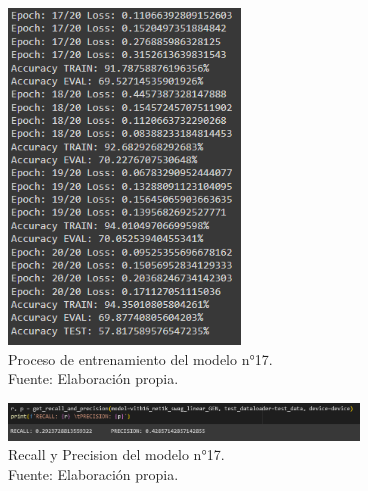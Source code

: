 \begin{figure}[H]
	\begin{center}
		\includegraphics[width=0.55\textwidth]{4/figures/model17_train.PNG}
		\caption[Proceso de entrenamiento del modelo n°17]{Proceso de entrenamiento del modelo n°17. \\
		Fuente: Elaboración propia.}
		\label{4:fig152}
	\end{center}
\end{figure}

\begin{figure}[H]
	\begin{center}
		\includegraphics[width=0.83\textwidth]{4/figures/model17_rp.PNG}
		\caption[Recall y Precision del modelo n°17]{Recall y Precision del modelo n°17. \\
		Fuente: Elaboración propia.}
		\label{4:fig153}
	\end{center}
\end{figure}

